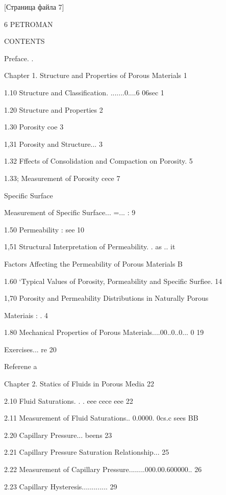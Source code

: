\documentclass[
  11pt,
]{article}
\begin{document}
\begingroup\small\setlength{\parindent}{0pt}\setlength{\parskip}{1pt}
{[}Страница файла 7{]}\par
6 PETROMAN\par
\smallskip
CONTENTS\par
\smallskip
Preface. .\par
\smallskip
Chapter 1. Structure and Properties of Porous Materials 1\par
1.10 Structure and Classification. .......0....6 06sec 1\par
1.20 Structure and Properties 2\par
1.30 Porosity coe 3\par
1,31 Porosity and Structure... 3\par
1.32 Fffects of Consolidation and Compaction on Porosity. 5\par
1.33; Measurement of Porosity cece 7\par
{} Specific Surface\par
{} Measurement of Specific Surface... =... : 9\par
1.50 Permeability : see 10\par
1,51 Structural Interpretation of Permeability. . as .. it\par
{} Factors Affecting the Permeability of Porous Materials B\par
1.60 `Typical Values of Porosity, Pormeability and Specific Surfiee. 14\par
1,70 Porosity and Permeability Distributions in Naturally Porous\par
\smallskip
Materiais : . 4\par
1.80 Mechanical Properties of Porous Materials....00..0..0... 0 19\par
Exercises... re 20\par
Referene a\par
Chapter 2. Statics of Fluids in Porous Media 22\par
2.10 Fluid Saturations. . . eee cece eee 22\par
2.11 Measurement of Fluid Saturations.. 0.0000. 0cs.c sees BB\par
2.20 Capillary Pressure... beens 23\par
2.21 Capillary Pressure Saturation Relationship... 25\par
2.22 Measurement of Capillary Pressure........000.00.600000.. 26\par
2.23 Capillary Hysteresis............. 29\par
\smallskip
\end{document}
